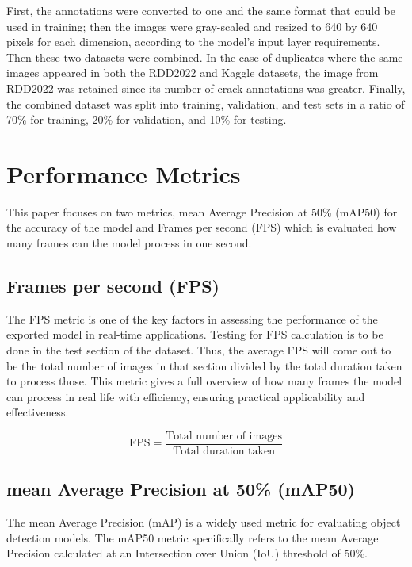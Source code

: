 First, the annotations were converted to one and the same format that could be used in training; then the images were gray-scaled and resized to 640 by 640 pixels for each dimension, according to the model's input layer requirements. Then these two datasets were combined. In the case of duplicates where the same images appeared in both the RDD2022 and Kaggle datasets, the image from RDD2022 was retained since its number of crack annotations was greater. Finally, the combined dataset was split into training, validation, and test sets in a ratio of 70\% for training, 20\% for validation, and 10\% for testing.

\section{Performance Metrics}
This paper focuses on two metrics, mean Average Precision at 50\% (mAP50) for the accuracy of the model and Frames per second (FPS) which is evaluated how many frames can the model process in one second.

\subsection{Frames per second (FPS)}
The FPS metric is one of the key factors in assessing the performance of the exported model in real-time applications. Testing for FPS calculation is to be done in the test section of the dataset. Thus, the average FPS will come out to be the total number of images in that section divided by the total duration taken to process those. This metric gives a full overview of how many frames the model can process in real life with efficiency, ensuring practical applicability and effectiveness.

\begin{equation}
\text{FPS} = \frac{\text{Total number of images}}{\text{Total duration taken}}
\end{equation}


\subsection{mean Average Precision at 50\% (mAP50)}

The mean Average Precision (mAP) is a widely used metric for evaluating object detection models. The mAP50 metric specifically refers to the mean Average Precision calculated at an Intersection over Union (IoU) threshold of 50\%.\cite{padilla2021comparative}

